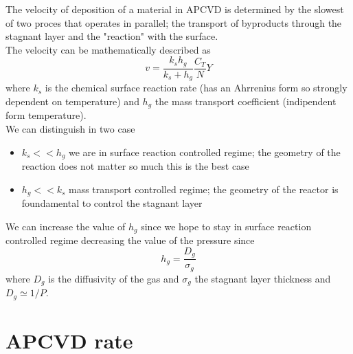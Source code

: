 The velocity of deposition of a material in APCVD is determined by the slowest of two proces that operates in parallel; the transport of byproducts through the stagnant layer and the "reaction" with the surface.\\
The velocity can be mathematically described as 
\begin{equation}
v=\frac{k_sh_g}{k_s+h_g}\frac{C_T}{N}Y
\end{equation}
where $k_s$ is the chemical surface reaction rate (has an Ahrrenius form so strongly dependent on temperature) and $h_g$ the mass transport coefficient (indipendent form temperature).\\
We can distinguish in two case 
\begin{itemize}
\item $k_s<<h_g$ we are in surface reaction controlled regime; the geometry of the reaction does not matter so much this is the best case
\item $h_g<<k_s$ mass transport controlled regime; the geometry of the reactor is foundamental to control the stagnant layer 
\end{itemize}

\vspace{5mm}
We can increase the value of $h_g$ since we hope to stay in surface reaction controlled regime decreasing the value of the pressure since 
\begin{equation}
h_g=\frac{D_g}{\sigma_g}
\end{equation}
where $D_g$ is the diffusivity of the gas and $\sigma_g$ the stagnant layer thickness and $D_g\simeq 1/P$.\\


\section{APCVD rate}

\centering

